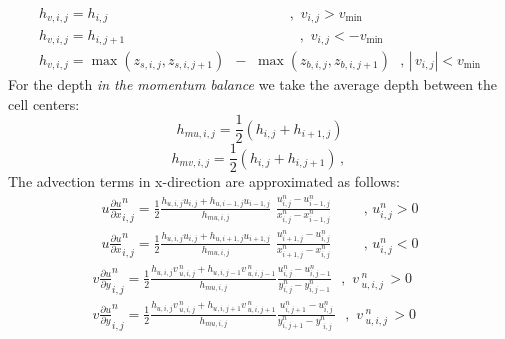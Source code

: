 \begin{equation} \label{12)} 
\begin{array}{l} {h_{v,i,j} =h_{i,j} \, \, \, \, \, \, \, \, \, \, \, \, \, \, \, \, \, \, \, \, \, \, \, \, \, \, \, \, \, \, \, \, \, \, \, \, \, \, \, \, \, \, \, \, \, \, \, \, \, \, \, \, \, \, \, \, \, \, \, \, \, \, \, \, \, \, \, \, \, \, \, \, \, \, \, \, \, \, ,\, \, v_{i,j} >v_{\min } } \\ {h_{v,i,j} =h_{i,j+1} \, \, \, \, \, \, \, \, \, \, \, \, \, \, \, \, \, \, \, \, \, \, \, \, \, \, \, \, \, \, \, \, \, \, \, \, \, \, \, \, \, \, \, \, \, \, \, \, \, \, \, \, \, \, \, \, \, \, \, \, \, \, \, \, \, \, \, \, \, \, \, \, \, \, \, ,\, \, v_{i,j} <-v_{\min } } \\ {h_{v,i,j} =\max (z_{s,i,j} ,z_{s,i,j+1} )\, \, \, -\, \, \max (z_{b,i,j} ,z_{b,i,j+1} )\, \, \, \, ,\, \left|\, v_{i,j} \right|<v_{\min } } \end{array} 
\end{equation} 
For the depth \textit{in the momentum balance} we take the average depth between the cell centers:
\begin{equation} \label{2.13)} 
h_{mu,i,j} =\frac{1}{2} (h_{i,j} +h_{i+1,j} ) 
\end{equation} 
\begin{equation} \label{2.14)} 
h_{mv,i,j} =\frac{1}{2} (h_{i,j} +h_{i,j+1} )\, ,\,  
\end{equation} 
The advection terms in x-direction are approximated as follows:
\begin{equation} \label{15)} 
\begin{array}{l} {u\frac{\partial u}{\partial x} _{i,j}^{n} =\frac{1}{2} \frac{h_{u,i,j} u_{i,j} +h_{u,i-1,j} u_{i-1,j} }{h_{mu,i,j} } \, \, \frac{u_{i,j}^{n} -u_{i-1,j}^{n} }{x_{i,j}^{n} -x_{i-1,j}^{n} } \, \, \, \, \, \, \, \, \, \, \, \, \, \, ,\, u_{i,j}^{n} >0} \\ {u\frac{\partial u}{\partial x} _{i,j}^{n} =\frac{1}{2} \frac{h_{u,i,j} u_{i,j} +h_{u,i+1,j} u_{i+1,j} }{h_{mu,i,j} } \, \, \frac{u_{i+1,j}^{n} -u_{i,j}^{n} }{x_{i+1,j}^{n} -x_{i,j}^{n} } \, \, \, \, \, \, \, \, \, \, \, \, \, \, ,\, u_{i,j}^{n} <0} \end{array} 
\end{equation} 
\begin{equation} \label{16)} 
\begin{array}{l} {v\frac{\partial u}{\partial y} _{i,j}^{n} =\frac{1}{2} \frac{h_{u,i,j} v\, _{u,i,j}^{n} +h_{u,i,j-1} v\, _{u,i,j-1}^{n} }{h_{mu,i,j} } \frac{u_{i,j}^{n} -u_{i,j-1}^{n} }{y_{i,j}^{n} -y_{i,j-1}^{n} } \, \, \, \, ,\, \, v\, _{u,i,j}^{n} \, >0\, \, \, \, \, \, } \\ {v\frac{\partial u}{\partial y} _{i,j}^{n} =\frac{1}{2} \frac{h_{u,i,j} v\, _{u,i,j}^{n} +h_{u,i,j+1} v\, _{u,i,j+1}^{n} }{h_{mu,i,j} } \frac{u_{i,j+1}^{n} -u_{i,j}^{n} }{y_{i,j+1}^{n} -y_{\begin{array}{l} {i,j} \\ {} \end{array}}^{n} } \, \, \, \, ,\, \, v\, _{u,i,j}^{n} \, >0\, \, \, \, \, } \end{array} 
\end{equation} 

